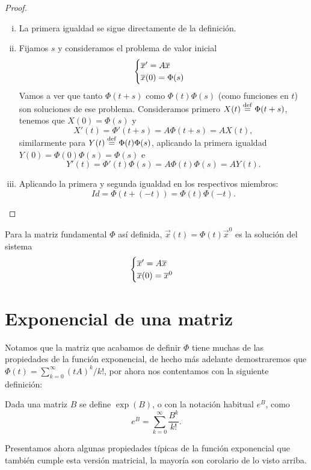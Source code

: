 \documentclass[../ecuaciones_diferenciales.tex]{subfiles}
\begin{document}
\begin{proof}
	\begin{enumerate}[i), wide, labelwidth=0pt, labelindent=0pt]
		\item La primera igualdad se sigue directamente de la definición.

		\item Fijamos \(s\) y consideramos el problema de valor inicial
			\[\begin{cases}\overline{x}' = A\overline{x} \\ \overline{x}(0) = \Phi(s) \end{cases}\]
		      Vamos a ver que tanto \(\Phi(t + s)\) como \(\Phi(t)\Phi(s)\) (como
		      funciones en \(t\)) son soluciones de ese problema. Consideramos
		      primero \(X(t) \overset{\operatorname{def}}{=} \Phi(t + s)\), tenemos que \(X(0) = \Phi(s)\) y
		      \[X'(t) = \Phi'(t + s) = A \Phi(t + s) = A X(t),\]
		      similarmente para \(Y(t) \overset{\operatorname{def}}{=} \Phi(t)\Phi(s)\), aplicando la primera
		      igualdad \(Y(0) = \Phi(0)\Phi(s) = \Phi(s)\) e
		      \[Y'(t) = \Phi'(t)\Phi(s) = A \Phi(t)\Phi(s) = A Y(t).\]

		\item Aplicando la primera y segunda igualdad en los respectivos
		      miembros:
		      \[\mathit{Id} = \Phi(t + (-t)) = \Phi(t)\Phi(-t).\]
	\end{enumerate}
\end{proof}

Para la matriz fundamental \(\Phi\) así definida, 
\(\vec{x}(t) = \Phi(t)\vec{x}^0\) es la solución del sistema
\[\begin{cases}\overline{x}' = A\overline{x} \\ \overline{x}(0) = \overline{x}^0\end{cases}\]

\section{Exponencial de una matriz}

Notamos que la matriz que acabamos de definir \(\Phi\) tiene muchas de las
propiedades de la función exponencial, de hecho más adelante demostraremos que
\(\Phi(t) = \sum_{k=0}^\infty (tA)^k/k!\), por ahora nos contentamos con la
siguiente definición:

\begin{definition}
	Dada una matriz \(B\) se define \(\exp(B)\), o con la notación habitual
	\(e^B\), como
	\[e^B = \sum_{k = 0}^\infty \frac{B^k}{k!}.\]
\end{definition}

Presentamos ahora algunas propiedades típicas de la función exponencial que
también cumple esta versión matricial, la mayoría son corolario de lo visto
arriba.
\end{document}

